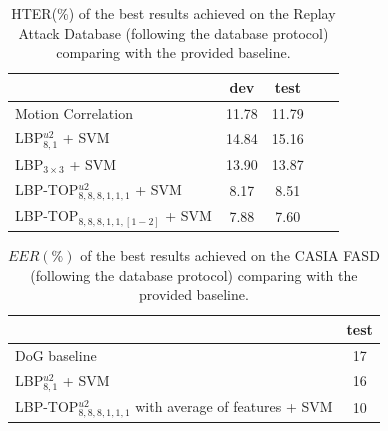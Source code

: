 \begin{table}
   \caption{HTER(\%) of the best results achieved on the Replay Attack Database (following the database protocol) comparing with the provided baseline.}
   \begin{center}

     \begin{tabular}{l | c c | c c |}
        \cline{2-3}
         & \textbf{dev} & \textbf{test} \\ \hline
         \multicolumn{1}{|l|}{Motion Correlation \cite{AnjosIJCB2011} } & 11.78 & 11.79  \\ \hline
         \multicolumn{1}{|l|}{LBP$_{8,1}^{u2}$ + SVM} & 14.84 & 15.16 \\ \hline
         \multicolumn{1}{|l|}{LBP$_{3\times3}$ + SVM~\cite{ChingovskaBIOSIG2012}} & 13.90 & 13.87 \\ \hline         
        \multicolumn{1}{|l|}{LBP-TOP$^{u2}_{8,8,8,1,1,1}$ + SVM} & 8.17 & 8.51  \\ \hline
        \multicolumn{1}{|l|}{LBP-TOP$_{8,8,8,1,1,[1-2]}$ + SVM} & 7.88 & 7.60  \\ \hline
     \end{tabular}
   \end{center}
   \label{tb_REPLAY_Results}
\end{table}

\begin{table}
   \caption{$EER(\%)$ of the best results achieved on the CASIA FASD (following the database protocol) comparing with the provided baseline.}
   \begin{center}

     \begin{tabular}{l | c |}
         \cline{2-2}
         & \textbf{test} \\ \hline
         \multicolumn{1}{|l|}{DoG baseline \cite{zhangface}} & 17 \\ \hline
         \multicolumn{1}{|l|}{LBP$_{8,1}^{u2}$ + SVM} & 16 \\ \hline
         \multicolumn{1}{|l|}{LBP-TOP$^{u2}_{8,8,8,1,1,1}$ with average of features + SVM} & 10  \\ \hline

     \end{tabular}
   \end{center}
   \label{tb_CASIA_Results}
\end{table}

